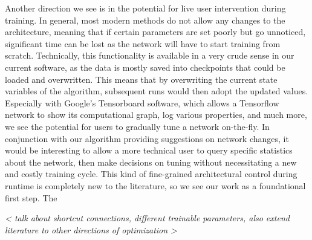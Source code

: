 Another direction we see is in the potential for live user intervention during training.
In general, most modern methods do not allow any changes to the architecture, meaning that if certain parameters are set poorly but go unnoticed, significant time can be lost as the network will have to start training from scratch.
Technically, this functionality is available in a very crude sense in our current software, as the data is mostly saved into checkpoints that could be loaded and overwritten.
This means that by overwriting the current state variables of the algorithm, subsequent runs would then adopt the updated values.
Especially with Google's Tensorboard software, which allows a Tensorflow network to show its computational graph, log various properties, and much more, we see the potential for users to gradually tune a network on-the-fly.
In conjunction with our algorithm providing suggestions on network changes, it would be interesting to allow a more technical user to query specific statistics about the network, then make decisions on tuning without necessitating a new and costly training cycle.
This kind of fine-grained architectural control during runtime is completely new to the literature, so we see our work as a foundational first step.
The 


\emph{ < talk about shortcut connections, different trainable parameters, also extend literature to other directions of optimization > }

